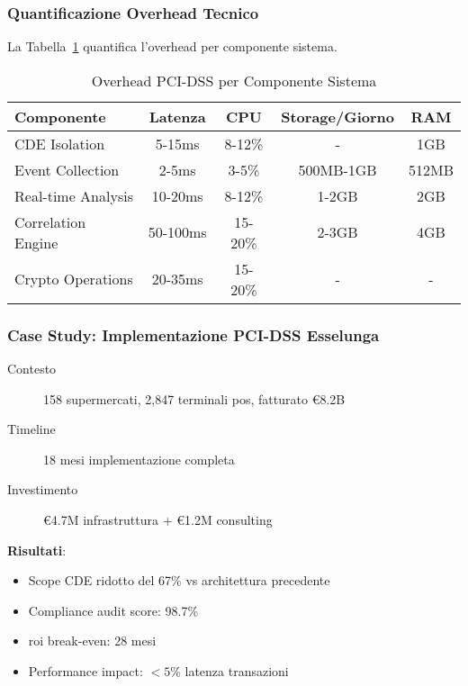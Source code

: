 \subsubsection{Quantificazione Overhead Tecnico}

La Tabella~\ref{tab:overhead-pci-dss} quantifica l'overhead per componente sistema.

\begin{table}[htbp]
\centering
\caption{Overhead PCI-DSS per Componente Sistema}
\label{tab:overhead-pci-dss}
\begin{tabular}{|l|c|c|c|c|}
\hline
\textbf{Componente} & \textbf{Latenza} & \textbf{CPU} & \textbf{Storage/Giorno} & \textbf{RAM} \\
\hline
CDE Isolation & 5-15ms & 8-12\% & - & 1GB \\
\hline
Event Collection & 2-5ms & 3-5\% & 500MB-1GB & 512MB \\
\hline
Real-time Analysis & 10-20ms & 8-12\% & 1-2GB & 2GB \\
\hline
Correlation Engine & 50-100ms & 15-20\% & 2-3GB & 4GB \\
\hline
Crypto Operations & 20-35ms & 15-20\% & - & - \\
\hline
\end{tabular}
\end{table}

\subsubsection{Case Study: Implementazione PCI-DSS Esselunga}

\begin{description}
    \item[Contesto] 158 supermercati, 2,847 terminali \gls{pos}, fatturato €8.2B
    \item[Timeline] 18 mesi implementazione completa
    \item[Investimento] €4.7M infrastruttura + €1.2M consulting
\end{description}

\textbf{Risultati}:
\begin{itemize}
    \item Scope CDE ridotto del 67\% vs architettura precedente
    \item Compliance audit score: 98.7\%
    \item \gls{roi} break-even: 28 mesi
    \item Performance impact: $<5$\% latenza transazioni
\end{itemize}

